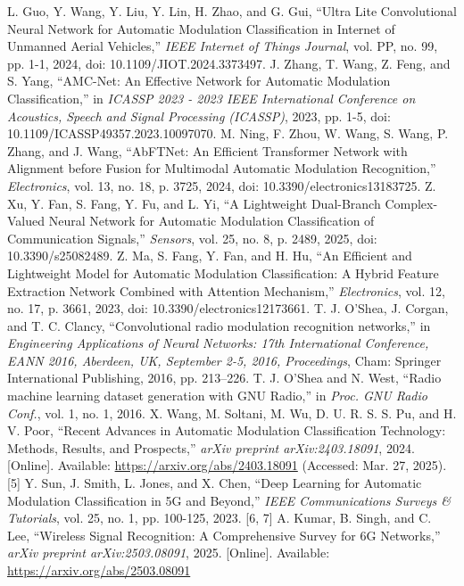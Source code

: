\documentclass[conference]{IEEEtran}
\begin{document}
\begin{thebibliography}{00}

 L. Guo, Y. Wang, Y. Liu, Y. Lin, H. Zhao, and G. Gui, ``Ultra Lite Convolutional Neural Network for Automatic Modulation Classification in Internet of Unmanned Aerial Vehicles,'' \textit{IEEE Internet of Things Journal}, vol. PP, no. 99, pp. 1-1, 2024, doi: 10.1109/JIOT.2024.3373497.
 J. Zhang, T. Wang, Z. Feng, and S. Yang, ``AMC-Net: An Effective Network for Automatic Modulation Classification,'' in \textit{ICASSP 2023 - 2023 IEEE International Conference on Acoustics, Speech and Signal Processing (ICASSP)}, 2023, pp. 1-5, doi: 10.1109/ICASSP49357.2023.10097070.
 M. Ning, F. Zhou, W. Wang, S. Wang, P. Zhang, and J. Wang, ``AbFTNet: An Efficient Transformer Network with Alignment before Fusion for Multimodal Automatic Modulation Recognition,'' \textit{Electronics}, vol. 13, no. 18, p. 3725, 2024, doi: 10.3390/electronics13183725.
 Z. Xu, Y. Fan, S. Fang, Y. Fu, and L. Yi, ``A Lightweight Dual-Branch Complex-Valued Neural Network for Automatic Modulation Classification of Communication Signals,'' \textit{Sensors}, vol. 25, no. 8, p. 2489, 2025, doi: 10.3390/s25082489.
 Z. Ma, S. Fang, Y. Fan, and H. Hu, ``An Efficient and Lightweight Model for Automatic Modulation Classification: A Hybrid Feature Extraction Network Combined with Attention Mechanism,'' \textit{Electronics}, vol. 12, no. 17, p. 3661, 2023, doi: 10.3390/electronics12173661.
 T. J. O'Shea, J. Corgan, and T. C. Clancy, ``Convolutional radio modulation recognition networks,'' in \textit{Engineering Applications of Neural Networks: 17th International Conference, EANN 2016, Aberdeen, UK, September 2-5, 2016, Proceedings}, Cham: Springer International Publishing, 2016, pp. 213--226.
 T. J. O'Shea and N. West, ``Radio machine learning dataset generation with GNU Radio,'' in \textit{Proc. GNU Radio Conf.}, vol. 1, no. 1, 2016.
\bibitem{[5]} X. Wang, M. Soltani, M. Wu, D. U. R. S. S. Pu, and H. V. Poor, ``Recent Advances in Automatic Modulation Classification Technology: Methods, Results, and Prospects,'' \textit{arXiv preprint arXiv:2403.18091}, 2024. [Online]. Available: \url{https://arxiv.org/abs/2403.18091} (Accessed: Mar. 27, 2025). [5]
\bibitem{[6]} Y. Sun, J. Smith, L. Jones, and X. Chen, ``Deep Learning for Automatic Modulation Classification in 5G and Beyond,'' \textit{IEEE Communications Surveys \& Tutorials}, vol. 25, no. 1, pp. 100-125, 2023. [6, 7]
\bibitem{[21]} A. Kumar, B. Singh, and C. Lee, ``Wireless Signal Recognition: A Comprehensive Survey for 6G Networks,'' \textit{arXiv preprint arXiv:2503.08091}, 2025. [Online]. Available: \url{https://arxiv.org/abs/2503.08091}

\end{thebibliography}
\end{document}
